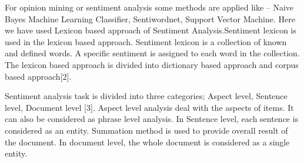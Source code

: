 \documentclass[12pt]{article}
\begin{document}
\begin{justify}
\tab For opinion mining or sentiment analysis some methods are applied like – Naive Bayes Machine Learning Classifier, Sentiwordnet, Support Vector Machine. Here we have used Lexicon based approach of Sentiment Analysis.Sentiment lexicon is used in the lexicon based approach. Sentiment lexicon is a collection of known and defined words. A specific sentiment is assigned to each word in the collection. The lexicon based approach is divided into dictionary based approach and corpus based approach[2].
\end{justify}\par

\begin{justify}
\tab Sentiment analysis task is divided into three categories; Aspect level, Sentence level, Document level [3]. Aspect level analysis deal with the aspects of items. It can also be considered as phrase level analysis. In Sentence level, each sentence is considered as an entity. Summation method is used to provide overall result of the document. In document level, the whole document is considered as a single entity.
\end{justify}\par


\vspace{\baselineskip}

\newpage

\vspace{\baselineskip}

\vspace{\baselineskip}

\vspace{\baselineskip}

\vspace{\baselineskip}

\vspace{\baselineskip}

\vspace{\baselineskip}

\vspace{\baselineskip}

\vspace{\baselineskip}

\vspace{\baselineskip}

\vspace{\baselineskip}

\vspace{\baselineskip}
\end{document}
